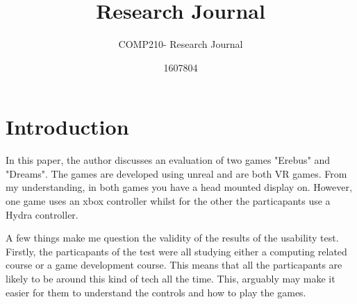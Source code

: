 \documentclass{scrartcl}
\title{Research Journal}
\subtitle{COMP210- Research Journal}
\author{1607804}
\begin{document}
\maketitle

\section{Introduction}

In this paper, the author discusses an evaluation of two games "Erebus" and "Dreams".
The games are developed using unreal and are both VR games.
From my understanding, in both games you have a head mounted display on. However, one game uses an xbox controller whilst for the other
the particapants use a Hydra controller. 

A few things make me question the validity of the results of the usability test.
Firstly, the particapants of the test were all studying either a computing related course or a game development course. 
This means that all the particapants are likely to be around this kind of tech all the time. 
This, arguably may make it easier for them to understand the controls and how to play the games. 




\end{document}
